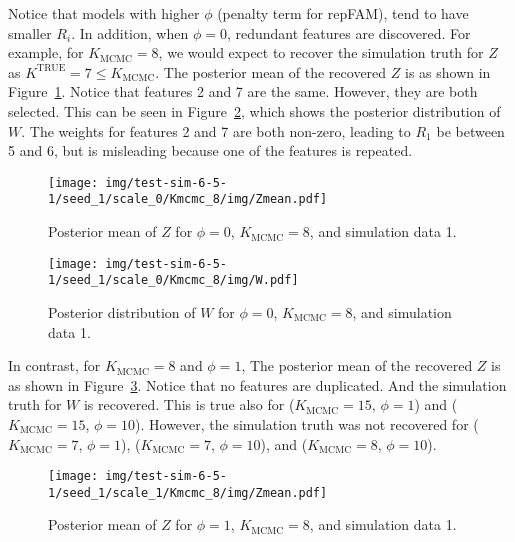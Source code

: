 \documentclass[12pt]{article} %
\def\true{\text{TRUE}}
\begin{document}
Notice that models with higher $\phi$ (penalty term for repFAM), tend to have
smaller $R_i$. In addition, when $\phi=0$, redundant features are discovered.
For example, for $K_\text{MCMC} = 8$, we would expect to recover the simulation
truth for $Z$ as $K^\true = 7 \le K_\text{MCMC}$. The posterior mean of the
recovered $Z$ is as shown in Figure~\ref{fig:kmcmc8-scale0-zmean}. Notice that
features 2 and 7 are the same.  However, they are both selected. This can be seen
in Figure~\ref{fig:kmcmc8-scale0-w}, which shows the posterior distribution of $W$.
The weights for features 2 and 7 are both non-zero, leading to $R_1$ be between
5 and 6, but is misleading because one of the features is repeated.

\begin{figure}[h]
  \begin{center}
    \texttt{[image: img/test-sim-6-5-1/seed\_1/scale\_0/Kmcmc\_8/img/Zmean.pdf]}
  \end{center}
  \caption{Posterior mean of $Z$ for $\phi=0$, $K_\text{MCMC}=8$, and
  simulation data 1.}
  \label{fig:kmcmc8-scale0-zmean}
\end{figure}

\begin{figure}[h]
  \begin{center}
    \texttt{[image: img/test-sim-6-5-1/seed\_1/scale\_0/Kmcmc\_8/img/W.pdf]}
  \end{center}
  \caption{Posterior distribution of $W$ for $\phi=0$, $K_\text{MCMC}=8$, and
  simulation data 1.}
  \label{fig:kmcmc8-scale0-w}
\end{figure}

In contrast, for $K_\text{MCMC} = 8$ and $\phi=1$, The posterior mean of the
recovered $Z$ is as shown in Figure~\ref{fig:kmcmc8-scale1-zmean}. Notice that
no features are duplicated.  And the simulation truth for $W$ is recovered.
This is true also for ($K_\text{MCMC}=15$, $\phi=1$) and ($K_\text{MCMC}=15$,
$\phi=10$).  However, the simulation truth was not recovered for
($K_\text{MCMC}=7$, $\phi=1$), ($K_\text{MCMC}=7$, $\phi=10$), and
($K_\text{MCMC}=8$, $\phi=10$).

\begin{figure}[H]
  \begin{center}
    \texttt{[image: img/test-sim-6-5-1/seed\_1/scale\_1/Kmcmc\_8/img/Zmean.pdf]}
  \end{center}
  \caption{Posterior mean of $Z$ for $\phi=1$, $K_\text{MCMC}=8$, and
  simulation data 1.}
  \label{fig:kmcmc8-scale1-zmean}
\end{figure}
\end{document}

